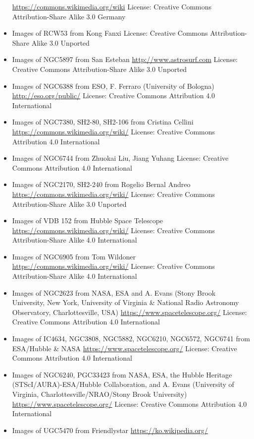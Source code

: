 \begin{itemize}
	 \url{https://commons.wikimedia.org/wiki}
	 License: Creative Commons Attribution-Share Alike 3.0 Germany
\item Images of RCW53
	 from Kong Fanxi
	 License: Creative Commons Attribution-Share Alike 3.0 Unported
\item Images of NGC5897
	 from San Esteban
	 \url{http://www.astrosurf.com}
	 License: Creative Commons Attribution-Share Alike 3.0 Unported
\item Images of NGC6388
	 from ESO, F. Ferraro (University of Bologna)
	 \url{http://eso.org/public/}
	 License: Creative Commons Attribution 4.0 International 
\item Images of NGC7380, SH2-80, SH2-106
	 from Cristina Cellini
	 \url{https://commons.wikimedia.org/wiki/}
	 License: Creative Commons Attribution 4.0 International
\item Images of NGC6744
	 from Zhuokai Liu, Jiang Yuhang
	 License: Creative Commons Attribution 4.0 International 
\item Images of NGC2170, SH2-240
	 from Rogelio Bernal Andreo
	 \url{https://commons.wikimedia.org/wiki/}
	 License: Creative Commons Attribution-Share Alike 3.0 Unported
\item Images of VDB 152
	 from Hubble Space Telescope
	 \url{https://commons.wikimedia.org/wiki/}
	 License: Creative Commons Attribution-Share Alike 4.0 International
\item Images of NGC6905
	 from Tom Wildoner
	 \url{https://commons.wikimedia.org/wiki/}
	 License: Creative Commons Attribution-Share Alike 4.0 International
\item Images of NGC2623
	 from NASA, ESA and A. Evans (Stony Brook University, New York, University of Virginia \& National Radio Astronomy Observatory, Charlottesville, USA)
	 \url{https://www.spacetelescope.org/}
	 License: Creative Commons Attribution 4.0 International
\item Images of IC4634, NGC3808, NGC5882, NGC6210, NGC6572, NGC6741
	 from ESA/Hubble \& NASA
	 \url{https://www.spacetelescope.org/}
	 License: Creative Commons Attribution 4.0 International
\item Images of NGC6240, PGC33423
	 from NASA, ESA, the Hubble Heritage (STScI/AURA)-ESA/Hubble Collaboration, and A. Evans (University of Virginia, Charlottesville/NRAO/Stony Brook University)
	 \url{https://www.spacetelescope.org/}
	 License: Creative Commons Attribution 4.0 International
\item Images of UGC5470
	 from Friendlystar
	 \url{https://ko.wikipedia.org/}

\end{itemize}
